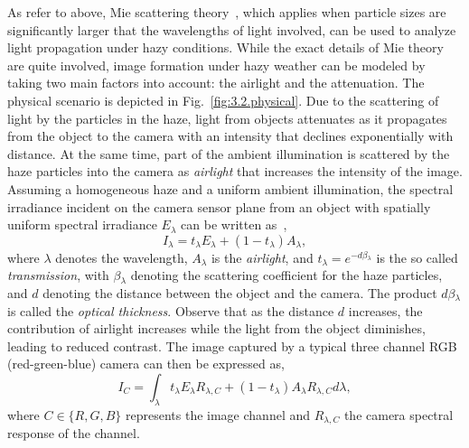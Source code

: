 As refer to above, Mie scattering theory~\cite[Chap. 5, 6]{McCartney76}, which applies when particle sizes are significantly larger that the wavelengths of light involved, can be used to analyze light propagation under hazy conditions. While the exact details of Mie theory are quite involved, image formation under hazy weather can be modeled by taking two main factors into account: the airlight and the attenuation. The physical scenario is depicted in Fig.~\ref{fig:3.2.physical}. Due to the scattering of light by the particles in the haze, light from objects attenuates as it propagates from the object to the camera with an intensity that declines exponentially with distance. At the same time, part of the ambient illumination is scattered by the haze particles into the camera as {\em airlight} that increases the intensity of the image.  Assuming a homogeneous haze and a uniform ambient illumination, the spectral irradiance incident on the camera sensor plane from an object with spatially uniform spectral irradiance $E_{\lambda}$  can be written as~\cite{Koschmieder24},
\begin{equation}
I_{\lambda} = t_{\lambda} E_{\lambda} + (1-t_{\lambda})A_{\lambda},
\label{eq:3.1}
\end{equation}
where $\lambda$ denotes the wavelength,  $A_{\lambda}$ is the {\em airlight}, and $t_{\lambda} = e^{-d \beta{_\lambda}}$ is the so called {\em transmission}, with $\beta{_\lambda}$  denoting the scattering coefficient for the haze particles, and $d$ denoting the distance between the object and the camera. The product $d \beta{_\lambda}$ is called the {\em optical thickness}. Observe that as the distance $d$ increases, the contribution of airlight increases while the light from the object diminishes, leading to reduced contrast. The image captured by a typical three channel RGB (red-green-blue) camera can then be expressed as,
\begin{equation}
I_{C} = \int_{\lambda}{t_{\lambda} E_{\lambda} R_{\lambda,C}+(1-t_{\lambda}) A_{\lambda} R_{\lambda,C}}d\lambda,
\label{eq:3.2}
\end{equation} 
where $C\in{\{R,G,B\}}$ represents the image channel and $R_{\lambda,C}$ the camera spectral response of the channel.

